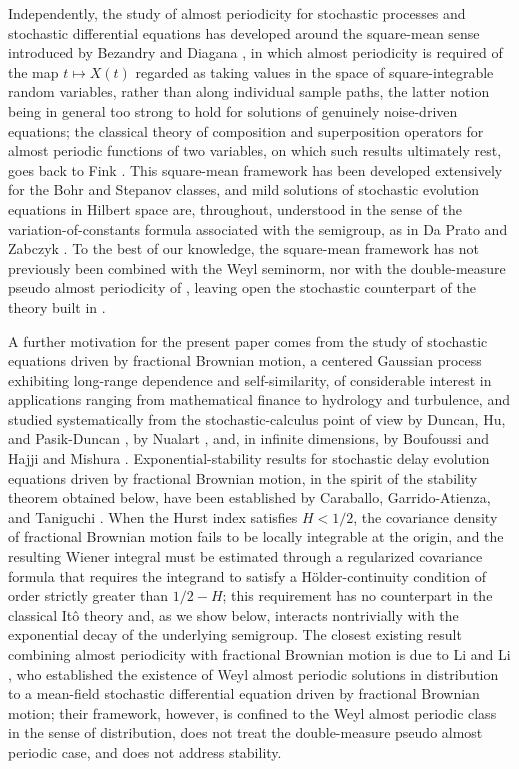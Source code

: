 \documentclass[11pt]{amsart}
\begin{document}
Independently, the study of almost periodicity for stochastic processes and stochastic differential equations has developed around the square-mean sense introduced by Bezandry and Diagana \cite{BezandryDiagana}, in which almost periodicity is required of the map $t\mapsto X(t)$ regarded as taking values in the space of square-integrable random variables, rather than along individual sample paths, the latter notion being in general too strong to hold for solutions of genuinely noise-driven equations; the classical theory of composition and superposition operators for almost periodic functions of two variables, on which such results ultimately rest, goes back to Fink \cite{Fink}. This square-mean framework has been developed extensively for the Bohr and Stepanov classes, and mild solutions of stochastic evolution equations in Hilbert space are, throughout, understood in the sense of the variation-of-constants formula associated with the semigroup, as in Da Prato and Zabczyk \cite{DaPratoZabczyk}. To the best of our knowledge, the square-mean framework has not previously been combined with the Weyl seminorm, nor with the double-measure pseudo almost periodicity of \cite{BlotCieutatEzzinbi}, leaving open the stochastic counterpart of the theory built in \cite{LiWeyl}.

A further motivation for the present paper comes from the study of stochastic equations driven by fractional Brownian motion, a centered Gaussian process exhibiting long-range dependence and self-similarity, of considerable interest in applications ranging from mathematical finance to hydrology and turbulence, and studied systematically from the stochastic-calculus point of view by Duncan, Hu, and Pasik-Duncan \cite{DHP}, by Nualart \cite{nualart}, and, in infinite dimensions, by Boufoussi and Hajji \cite{BoufoussiHajji} and Mishura \cite{Mishura}. Exponential-stability results for stochastic delay evolution equations driven by fractional Brownian motion, in the spirit of the stability theorem obtained below, have been established by Caraballo, Garrido-Atienza, and Taniguchi \cite{CaraballoGarridoTaniguchi}. When the Hurst index satisfies $H<1/2$, the covariance density of fractional Brownian motion fails to be locally integrable at the origin, and the resulting Wiener integral must be estimated through a regularized covariance formula that requires the integrand to satisfy a H\"older-continuity condition of order strictly greater than $1/2-H$; this requirement has no counterpart in the classical It\^o theory and, as we show below, interacts nontrivially with the exponential decay of the underlying semigroup. The closest existing result combining almost periodicity with fractional Brownian motion is due to Li and Li \cite{LiLi}, who established the existence of Weyl almost periodic solutions in distribution to a mean-field stochastic differential equation driven by fractional Brownian motion; their framework, however, is confined to the Weyl almost periodic class in the sense of distribution, does not treat the double-measure pseudo almost periodic case, and does not address stability.
\end{document}
